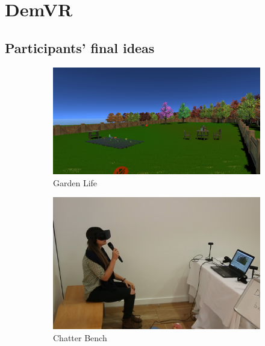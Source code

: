 \chapter{DemVR}

\section{Participants' final ideas}
\label{sec:EventIdeas}

\begin{figure}[htbp]
\begin{subfigure}[t]{0.3\textwidth}
    \includegraphics[width=\linewidth]{Images/DemVR/GardenLife.png}
\caption{Garden Life}
\label{fig:gardenLife}
\end{subfigure}\hfill
\begin{subfigure}[t]{0.3\textwidth}
  \includegraphics[width=\linewidth]{Images/DemVR/ChatterBench.png}
\caption{Chatter Bench}
\label{fig:ChatterBench}
\end{subfigure}\hfill
\begin{subfigure}[t]{0.3\textwidth}

\end{subfigure}
\end{figure}
